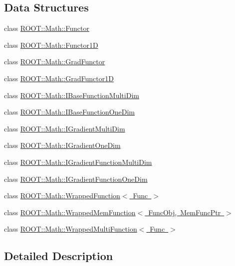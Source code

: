 \subsection*{Data Structures}
\begin{DoxyCompactItemize}
\item 
class \mbox{\hyperlink{classROOT_1_1Math_1_1Functor}{R\+O\+O\+T\+::\+Math\+::\+Functor}}
\item 
class \mbox{\hyperlink{classROOT_1_1Math_1_1Functor1D}{R\+O\+O\+T\+::\+Math\+::\+Functor1D}}
\item 
class \mbox{\hyperlink{classROOT_1_1Math_1_1GradFunctor}{R\+O\+O\+T\+::\+Math\+::\+Grad\+Functor}}
\item 
class \mbox{\hyperlink{classROOT_1_1Math_1_1GradFunctor1D}{R\+O\+O\+T\+::\+Math\+::\+Grad\+Functor1D}}
\item 
class \mbox{\hyperlink{classROOT_1_1Math_1_1IBaseFunctionMultiDim}{R\+O\+O\+T\+::\+Math\+::\+I\+Base\+Function\+Multi\+Dim}}
\item 
class \mbox{\hyperlink{classROOT_1_1Math_1_1IBaseFunctionOneDim}{R\+O\+O\+T\+::\+Math\+::\+I\+Base\+Function\+One\+Dim}}
\item 
class \mbox{\hyperlink{classROOT_1_1Math_1_1IGradientMultiDim}{R\+O\+O\+T\+::\+Math\+::\+I\+Gradient\+Multi\+Dim}}
\item 
class \mbox{\hyperlink{classROOT_1_1Math_1_1IGradientOneDim}{R\+O\+O\+T\+::\+Math\+::\+I\+Gradient\+One\+Dim}}
\item 
class \mbox{\hyperlink{classROOT_1_1Math_1_1IGradientFunctionMultiDim}{R\+O\+O\+T\+::\+Math\+::\+I\+Gradient\+Function\+Multi\+Dim}}
\item 
class \mbox{\hyperlink{classROOT_1_1Math_1_1IGradientFunctionOneDim}{R\+O\+O\+T\+::\+Math\+::\+I\+Gradient\+Function\+One\+Dim}}
\item 
class \mbox{\hyperlink{classROOT_1_1Math_1_1WrappedFunction}{R\+O\+O\+T\+::\+Math\+::\+Wrapped\+Function$<$ Func $>$}}
\item 
class \mbox{\hyperlink{classROOT_1_1Math_1_1WrappedMemFunction}{R\+O\+O\+T\+::\+Math\+::\+Wrapped\+Mem\+Function$<$ Func\+Obj, Mem\+Func\+Ptr $>$}}
\item 
class \mbox{\hyperlink{classROOT_1_1Math_1_1WrappedMultiFunction}{R\+O\+O\+T\+::\+Math\+::\+Wrapped\+Multi\+Function$<$ Func $>$}}
\end{DoxyCompactItemize}


\subsection{Detailed Description}
